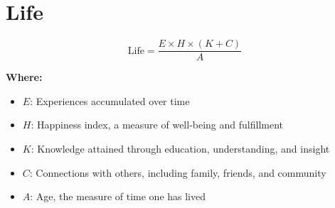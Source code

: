 \chapter{Life}

\begin{equation}
\text{Life} = \frac{E \times H \times (K + C)}{A}
\end{equation}

\textbf{Where:}

\begin{itemize}
    \item $E$: Experiences accumulated over time
    \item $H$: Happiness index, a measure of well-being and fulfillment
    \item $K$: Knowledge attained through education, understanding, and insight
    \item $C$: Connections with others, including family, friends, and community
    \item $A$: Age, the measure of time one has lived
\end{itemize}